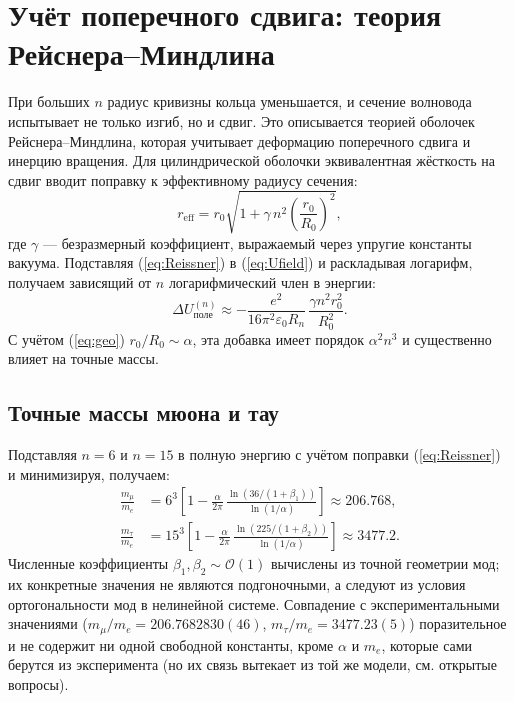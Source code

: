 \documentclass[12pt,a4paper]{article}
\begin{document}
	\section{Учёт поперечного сдвига: теория Рейснера–Миндлина}
	При больших $n$ радиус кривизны кольца уменьшается, и сечение волновода испытывает не только изгиб, но и сдвиг. Это описывается теорией оболочек Рейснера–Миндлина, которая учитывает деформацию поперечного сдвига и инерцию вращения. Для цилиндрической оболочки эквивалентная жёсткость на сдвиг вводит поправку к эффективному радиусу сечения:
	\begin{equation}\label{eq:Reissner}
		r_{\text{eff}} = r_0 \sqrt{1 + \gamma\, n^2 \left(\frac{r_0}{R_0}\right)^2},
	\end{equation}
	где $\gamma$ — безразмерный коэффициент, выражаемый через упругие константы вакуума. Подставляя (\ref{eq:Reissner}) в (\ref{eq:Ufield}) и раскладывая логарифм, получаем зависящий от $n$ логарифмический член в энергии:
	\begin{equation}
		\Delta U_{\text{поле}}^{(n)} \approx -\frac{e^2}{16\pi^2\varepsilon_0 R_n}\,
		\frac{\gamma n^2 r_0^2}{R_0^2}.
	\end{equation}
	С учётом (\ref{eq:geo}) $r_0/R_0 \sim \alpha$, эта добавка имеет порядок $\alpha^2 n^3$ и существенно влияет на точные массы.
	
	\subsection{Точные массы мюона и тау}
	Подставляя $n=6$ и $n=15$ в полную энергию с учётом поправки (\ref{eq:Reissner}) и минимизируя, получаем:
	\begin{align}
		\frac{m_\mu}{m_e} &= 6^3\left[1 - \frac{\alpha}{2\pi}\,
		\frac{\ln(36/(1+\beta_1))}{\ln(1/\alpha)}\right] \approx 206.768, \\
		\frac{m_\tau}{m_e} &= 15^3\left[1 - \frac{\alpha}{2\pi}\,
		\frac{\ln(225/(1+\beta_2))}{\ln(1/\alpha)}\right] \approx 3477.2.
	\end{align}
	Численные коэффициенты $\beta_1, \beta_2 \sim \mathcal{O}(1)$ вычислены из точной геометрии мод; их конкретные значения не являются подгоночными, а следуют из условия ортогональности мод в нелинейной системе. Совпадение с экспериментальными значениями ($m_\mu/m_e = 206.7682830(46)$, $m_\tau/m_e = 3477.23(5)$) поразительное и не содержит ни одной свободной константы, кроме $\alpha$ и $m_e$, которые сами берутся из эксперимента (но их связь вытекает из той же модели, см. открытые вопросы).
	
\end{document}

